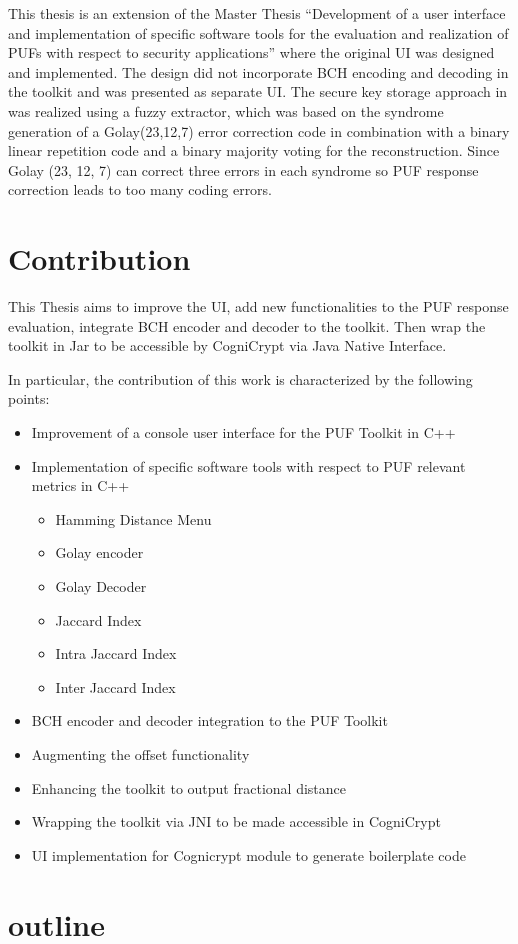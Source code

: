 This thesis is an extension of the Master Thesis ``Development of a user interface and implementation of specific software tools for the evaluation and realization of PUFs with respect to security applications''\cite{71} where the original UI was designed and implemented. The design did not incorporate BCH encoding and decoding in the toolkit and was presented as separate UI. The secure key storage approach in \cite{10} was realized using a fuzzy extractor, which was based on the syndrome
generation of a Golay(23,12,7) error correction code in combination with a binary linear repetition code and a binary majority voting for the reconstruction\cite{71}. Since Golay (23, 12, 7) can correct three errors in each syndrome so PUF response correction leads to too many coding errors.

\section{Contribution}
This Thesis aims to improve the UI, add new functionalities to the PUF response evaluation, integrate BCH encoder and decoder to the toolkit.
Then wrap the toolkit in Jar to be accessible by CogniCrypt via Java Native Interface.

In particular, the contribution of this work is characterized by the following points:

\begin{itemize}
	\item Improvement of a console user interface for the PUF Toolkit in C++
	\item Implementation of specific software tools with respect to PUF relevant metrics in C++
		\begin{itemize}
			\item Hamming Distance Menu
			\item Golay encoder 
			\item Golay Decoder
			\item Jaccard Index 
			\item Intra Jaccard Index
			\item Inter Jaccard Index
		\end{itemize}
	\item BCH encoder and decoder integration to the PUF Toolkit
	\item Augmenting the offset functionality
	\item Enhancing the toolkit to output fractional distance
	\item Wrapping the toolkit via JNI to be made accessible in CogniCrypt
	\item UI implementation for Cognicrypt module to generate boilerplate code
\end{itemize}

\section{outline} %
